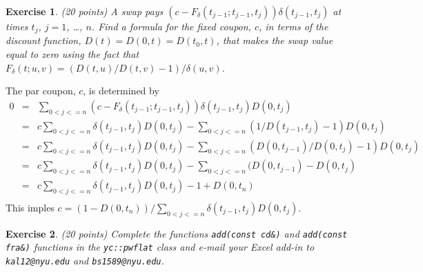 \documentclass[11pt,fleqn]{amsproc}
\newtheorem{xca}{Exercise}
\begin{document}
\begin{xca}{(20 points)}
A swap pays $(c - F_\delta(t_{j-1}; t_{j-1}, t_j))\delta(t_{j-1}, t_j)$
at times $t_j$, $j = 1$, \dots, $n$.  Find a formula for the fixed coupon,
$c$, in terms of the discount function, $D(t) = D(0,t) = D(t_0, t)$,
that makes the swap value equal to zero using the fact that
$F_\delta(t; u, v) = (D(t, u)/D(t, v) - 1)/\delta(u, v)$.

\end{xca}

The par coupon, $c$, is determined by 
\begin{eqnarray*}
0 &=& \sum_{0 < j <= n}
(c - F_\delta(t_{j-1}; t_{j-1}, t_j))\delta(t_{j-1}, t_j)D(0,t_j)\\
&=& c\sum_{0 < j <= n} \delta(t_{j-1}, t_j)D(0,t_j)
 - \sum_{0 < j <= n} (1/D(t_{j-1},t_j) - 1)D(0,t_j)\\
&=& c\sum_{0 < j <= n} \delta(t_{j-1}, t_j)D(0,t_j)
 - \sum_{0 < j <= n} (D(0,t_{j-1})/D(0,t_j) - 1)D(0,t_j)\\
&=& c\sum_{0 < j <= n} \delta(t_{j-1}, t_j)D(0,t_j)
 - \sum_{0 < j <= n} (D(0,t_{j-1}) - D(0,t_j)\\
&=& c\sum_{0 < j <= n} \delta(t_{j-1}, t_j)D(0,t_j)
 - 1 + D(0,t_n)\\
\end{eqnarray*}
This imples $c = (1 - D(0,t_n))/\sum_{0 < j <= n} \delta(t_{j-1}, t_j)D(0,t_j)$.


\begin{xca}{(20 points)}
Complete the functions {\tt add(const cd\&)} and {\tt add(const fra\&)}
functions in the {\tt yc::pwflat} class and e-mail your Excel add-in to
{\tt kal12@nyu.edu} and {\tt bs1589@nyu.edu}.

\end{xca}
\end{document}
